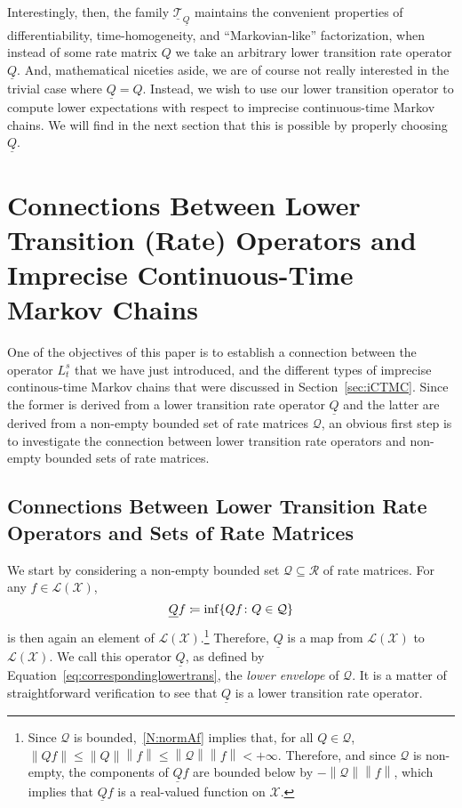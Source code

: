 \documentclass[10pt,a4paper]{paper}
\theoremstyle{definition}
\newcommand{\states}{\mathcal{X}}
\newcommand{\lbound}{L}
\newcommand{\gambles}{\mathcal{L}}
\newcommand{\gamblesX}{\gambles(\states)}
\newcommand{\rateset}{\mathcal{Q}}
\newcommand{\lrate}{\underline{Q}}
\newcommand{\norm}[1]{\left\lVert #1 \right\rVert}
\newcommand{\coloneqq}{:\!=}
\begin{document}
Interestingly, then, the family $\underline{\mathcal{T}}_{\lrate}$ maintains the convenient properties of differentiability, time-homogeneity, and ``Markovian-like'' factorization, when instead of some rate matrix $Q$ we take an arbitrary lower transition rate operator $\lrate$. And, mathematical niceties aside, we are of course not really interested in the trivial case where $\lrate=Q$. Instead, we wish to use our lower transition operator to compute lower expectations with respect to imprecise continuous-time Markov chains. We will find in the next section that this is possible by properly choosing $\lrate$.

\section{Connections Between Lower Transition (Rate) Operators and Imprecise Continuous-Time Markov Chains}\label{sec:connections}

One of the objectives of this paper is to establish a connection between the operator $\lbound_t^s$ that we have just introduced, and the different types of imprecise continous-time Markov chains that were discussed in Section~\ref{sec:iCTMC}. Since the former is derived from a lower transition rate operator $\lrate$ and the latter are derived from a non-empty bounded set of rate matrices $\rateset$, an obvious first step is to investigate the connection between lower transition rate operators and non-empty bounded sets of rate matrices.

\subsection{Connections Between Lower Transition Rate Operators and Sets of Rate Matrices}\label{sec:connections_rate}


We start by considering a non-empty bounded set $\rateset\subseteq\mathcal{R}$ of rate matrices. For any $f\in\gamblesX$,
\begin{equation}\label{eq:correspondinglowertrans}
\lrate f\coloneqq\inf\{Qf\colon Q\in\rateset\}\\[2mm]
\end{equation}
is then again an element of $\gamblesX$.\footnote{%
Since $\rateset$ is bounded,~\ref{N:normAf} implies that, for all $Q\in\rateset$, $\norm{Qf}\leq\norm{Q}\norm{f}\leq\norm{\rateset}\norm{f}<+\infty$. Therefore, and since $\rateset$ is non-empty, the components of $\lrate f$ are bounded below by $-\norm{\rateset}\norm{f}$, which implies that $\lrate f$ is a real-valued function on $\states$.}
Therefore, $\lrate$ is a map from $\gamblesX$ to $\gamblesX$. We call this operator $\lrate$, as defined by Equation~\eqref{eq:correspondinglowertrans}, the \emph{lower envelope} of $\rateset$. It is a matter of straightforward verification to see that $\lrate$ is a lower transition rate operator.
\end{document}
